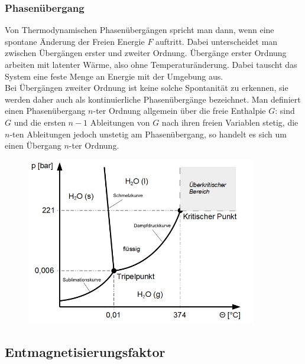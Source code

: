         \subsubsection*{Phasenübergang}
            Von Thermodynamischen Phasenübergängen spricht man dann, wenn eine spontane Änderung der Freien Energie $F$ auftritt.
            Dabei unterscheidet man zwischen Übergängen erster und zweiter Ordnung. Übergänge erster Ordnung
            arbeiten mit latenter Wärme, also ohne Temperaturänderung. Dabei tauscht das System eine feste Menge an Energie
            mit der Umgebung aus.\\
            Bei Übergängen zweiter Ordnung ist keine solche Spontanität zu erkennen, sie werden daher auch als kontinuierliche Phasenübergänge bezeichnet.
            Man definiert einen Phasenübergang $n$-ter Ordnung allgemein über die freie Enthalpie $G$: sind $G$ und die ersten $n-1$ Ableitungen von $G$ nach ihren freien Variablen stetig, 
            die $n$-ten Ableitungen jedoch unstetig am Phasenübergang, so handelt es sich um einen Übergang $n$-ter Ordnung.

            \begin{figure}[H]
                \centering
                \includegraphics[width=0.9\textwidth]{Images/waterphase.jpg}
            \end{figure}
    \subsection{Entmagnetisierungsfaktor}

